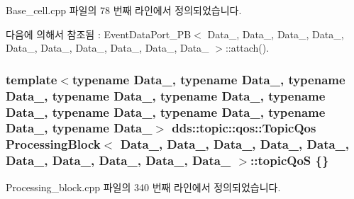 Base\+\_\+cell.\+cpp 파일의 78 번째 라인에서 정의되었습니다.



다음에 의해서 참조됨 \+:  Event\+Data\+Port\+\_\+\+P\+B$<$ Data\+\_, Data\+\_, Data\+\_, Data\+\_, Data\+\_, Data\+\_, Data\+\_, Data\+\_, Data\+\_, Data\+\_ $>$\+::attach().

\subsubsection[{\texorpdfstring{topic\+QoS}{topicQoS}}]{\setlength{\rightskip}{0pt plus 5cm}template$<$typename Data\+\_, typename Data\+\_, typename Data\+\_, typename Data\+\_, typename Data\+\_, typename Data\+\_, typename Data\+\_, typename Data\+\_, typename Data\+\_, typename Data\+\_$>$ dds\+::topic\+::qos\+::\+Topic\+Qos {\bf Processing\+Block}$<$ Data\+\_, Data\+\_, Data\+\_, Data\+\_, Data\+\_, Data\+\_, Data\+\_, Data\+\_, Data\+\_, Data\+\_ $>$\+::topic\+QoS \{\}}\hypertarget{classProcessingBlock_a0834476a4eb459338d9ca2ab2ef1d540}{}\label{classProcessingBlock_a0834476a4eb459338d9ca2ab2ef1d540}


Processing\+\_\+block.\+cpp 파일의 340 번째 라인에서 정의되었습니다.



